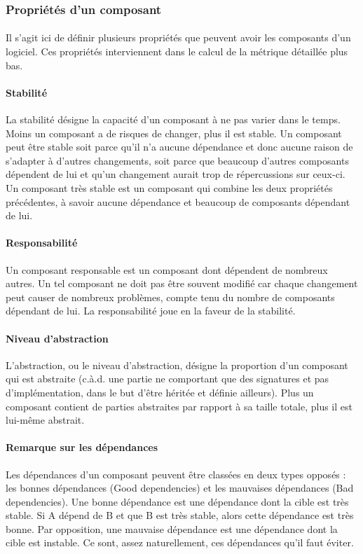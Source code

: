 \documentclass{scrartcl}
\begin{document}
\subsubsection{Propriétés d'un composant}
\label{componentProperties}

    \paragraph{}Il s'agit ici de définir plusieurs propriétés que peuvent avoir les composants d'un logiciel. Ces propriétés interviennent dans le calcul de la métrique détaillée plus bas.

    \paragraph{Stabilité}La stabilité désigne la capacité d'un composant à ne pas varier dans le temps. Moins un composant a de risques de changer, plus il est stable. Un composant peut être stable soit parce qu'il n'a aucune dépendance et donc aucune raison de s'adapter à d'autres changements, soit parce que beaucoup d'autres composants dépendent de lui et qu'un changement aurait trop de répercussions sur ceux-ci. Un composant très stable est un composant qui combine les deux propriétés précédentes, à savoir aucune dépendance et beaucoup de composants dépendant de lui.

    \paragraph{Responsabilité}Un composant responsable est un composant dont dépendent de nombreux autres. Un tel composant ne doit pas être souvent modifié car chaque changement peut causer de nombreux problèmes, compte tenu du nombre de composants dépendant de lui. La responsabilité joue en la faveur de la stabilité.
    
    \paragraph{Niveau d'abstraction}L'abstraction, ou le niveau d'abstraction, désigne la proportion d'un composant qui est abstraite (c.à.d. une partie ne comportant que des signatures et pas d'implémentation, dans le but d'être héritée et définie ailleurs). Plus un composant contient de parties abstraites par rapport à sa taille totale, plus il est lui-même abstrait.
    
    \paragraph{Remarque sur les dépendances}Les dépendances d'un composant peuvent être classées en deux types opposés : les bonnes dépendances (Good dependencies) et les mauvaises dépendances (Bad dependencies). Une bonne dépendance est une dépendance dont la cible est très stable. Si A dépend de B et que B est très stable, alors cette dépendance est très bonne. Par opposition, une mauvaise dépendance est une dépendance dont la cible est instable. Ce sont, assez naturellement, ces dépendances qu'il faut éviter.
    
\end{document}
